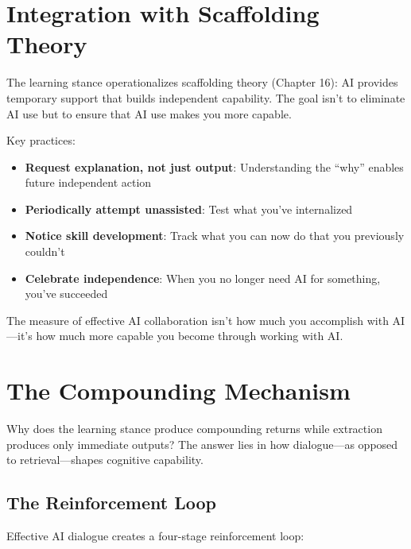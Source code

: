 \section{Integration with Scaffolding Theory}

The learning stance operationalizes scaffolding theory (Chapter 16): AI provides temporary support that builds independent capability. The goal isn't to eliminate AI use but to ensure that AI use makes you more capable.

Key practices:

\begin{itemize}
    \item \textbf{Request explanation, not just output}: Understanding the ``why'' enables future independent action
    \item \textbf{Periodically attempt unassisted}: Test what you've internalized
    \item \textbf{Notice skill development}: Track what you can now do that you previously couldn't
    \item \textbf{Celebrate independence}: When you no longer need AI for something, you've succeeded
\end{itemize}

The measure of effective AI collaboration isn't how much you accomplish with AI---it's how much more capable you become through working with AI.

\section{The Compounding Mechanism}

Why does the learning stance produce compounding returns while extraction produces only immediate outputs? The answer lies in how dialogue---as opposed to retrieval---shapes cognitive capability.

\subsection{The Reinforcement Loop}

Effective AI dialogue creates a four-stage reinforcement loop:

